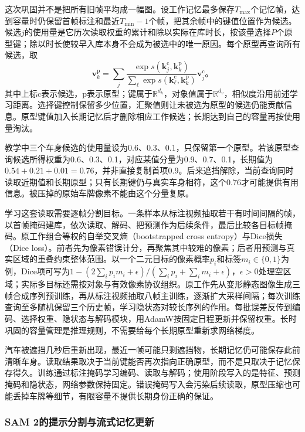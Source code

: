 这次巩固并不是把所有旧帧平均成一幅图。设工作记忆最多保存$T_{\max}$个记忆帧，达到容量时仍保留首帧标注和最近$T_{\min}-1$个帧，把其余帧中的键值位置作为候选。候选$j$的使用量是它历次读取权重的累计和除以实际在库时长，按该量选择$P$个原型键；除以时长使较早入库本身不会成为被选中的唯一原因。每个原型再查询所有候选，取
\begin{equation}
  \bm{v}^{\mathrm{p}}_k
  =\sum_j
   \frac{\exp s(\bm{k}^{\mathrm{c}}_j,\bm{k}^{\mathrm{p}}_k)}
        {\sum_\ell\exp s(\bm{k}^{\mathrm{c}}_\ell,\bm{k}^{\mathrm{p}}_k)}
   \bm{v}^{\mathrm{c}}_j\text{。}
  \label{eq:vision-video-xmem-consolidation}
\end{equation}
其中上标$\mathrm{c}$表示候选，$\mathrm{p}$表示原型；键属于$\mathbb{R}^{d_k}$，对象值属于$\mathbb{R}^{d_v}$，相似度沿用前述学习距离。选择键控制保留多少位置，汇聚值则让未被选为原型的候选仍能贡献信息。原型键值加入长期记忆后才删除相应工作候选；长期达到自己的容量再按使用量淘汰。

教学中三个车身候选的使用量设为0.6、0.3、0.1，只保留第一个原型。若该原型查询候选所得权重为0.6、0.3、0.1，对应某值分量为0.9、0.7、0.1，长期值为$0.54+0.21+0.01=0.76$，并非直接复制首项0.9。后来遮挡解除，当前查询同时读取近期值和长期原型；只有长期键仍与真实车身相符，这个0.76才可能提供有用信息。被压掉的原始车牌像素不能由这个分量复原。

学习这套读取需要逐帧分割目标。一条样本从标注视频抽取若干有时间间隔的帧，以首帧掩码建库，依次读取、解码、把预测作为后续条件，最后比较各目标帧掩码。原工作组合等权的自举交叉熵（bootstrapped cross entropy）与Dice损失（Dice loss）。前者先为像素错误计分，再聚焦其中较难的像素；后者用预测与真实区域的重叠约束整体范围。以一个二元目标的像素概率$p_i$和标签$m_i\in\{0,1\}$为例，Dice项可写为$1-(2\sum_i p_im_i+\epsilon)/(\sum_i p_i+\sum_i m_i+\epsilon)$，$\epsilon>0$处理空区域；实际多目标还需按对象与有效像素协议组织。原工作先从变形静态图像生成三帧合成序列预训练，再从标注视频抽取八帧主训练，逐渐扩大采样间隔；每次训练查询至多随机保留三个历史帧，学习隐状态对较长序列的作用。每批误差反传到编码、选择权重、隐状态与解码模块，用AdamW按固定日程更新并保留权重。长时巩固的容量管理是推理规则，不需要给每个长期原型重新求网络梯度。

汽车被遮挡几秒后重新出现，最近一帧可能只剩遮挡物，长期记忆仍可能保存此前清晰车身。读取结果取决于当前键能否再次指向正确原型，而不是只取决于记忆保存得久。训练通过标注掩码学习编码、读取与解码；使用阶段写入的是特征、预测掩码和隐状态，网络参数保持固定。错误掩码写入会污染后续读取，原型压缩也可能丢掉车牌等细节，有限容量不提供长期身份正确的保证。

\subsubsection{SAM 2的提示分割与流式记忆更新}
\label{sec:vision-video-sam2}

